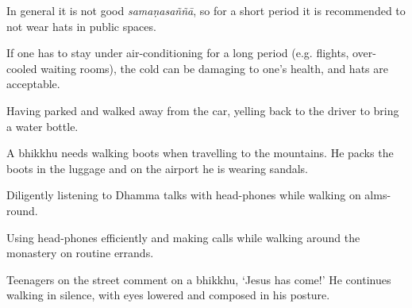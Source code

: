 \begin{exam}{\autoExamName}
\begin{problem*}
\begin{parts}
    \begin{solution}
      In general it is not good \emph{samaṇasaññā}, so for a short period it is recommended to not wear hats in public spaces.

      If one has to stay under air-conditioning for a long period (e.g. flights, over-cooled waiting rooms), the cold can be damaging to one's health, and hats are acceptable.
    \end{solution}

    \bigskip

    \item {} Having parked and walked away from the car, yelling back to the driver to bring a water bottle.

    \bigskip

    \item {} A bhikkhu needs walking boots when travelling to the mountains.
    He packs the boots in the luggage and on the airport he is wearing sandals.

    \bigskip

    \item {} Diligently listening to Dhamma talks with head-phones while
    walking on alms-round.

    \bigskip

    \item {} Using head-phones efficiently and making calls while walking
    around the monastery on routine errands.

    \bigskip

    \item {} Teenagers on the street comment on a bhikkhu, `Jesus has come!'
    He continues walking in silence, with eyes lowered and composed in his
    posture.

    \end{parts}

  \end{problem*}

\end{exam}
